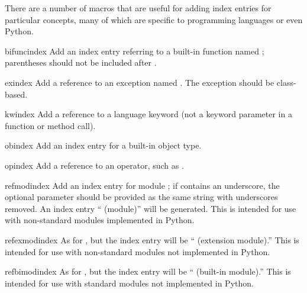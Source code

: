 \documentclass{howto}
\begin{document}
    There are a number of macros that are useful for adding index
    entries for particular concepts, many of which are specific to
    programming languages or even Python.

    \begin{macrodesc}{bifuncindex}{}
      Add an index entry referring to a built-in function named
      ; parentheses should not be included after
      .
    \end{macrodesc}

    \begin{macrodesc}{exindex}{}
      Add a reference to an exception named .  The
      exception should be class-based.
    \end{macrodesc}

    \begin{macrodesc}{kwindex}{}
      Add a reference to a language keyword (not a keyword parameter
      in a function or method call).
    \end{macrodesc}

    \begin{macrodesc}{obindex}{}
      Add an index entry for a built-in object type.
    \end{macrodesc}

    \begin{macrodesc}{opindex}{}
      Add a reference to an operator, such as \samp{+}.
    \end{macrodesc}

    \begin{macrodesc}{refmodindex}{}
      Add an index entry for module ; if 
      contains an underscore, the optional parameter  should
      be provided as the same string with underscores removed.  An
      index entry `` (module)'' will be generated.  This
      is intended for use with non-standard modules implemented in
      Python.
    \end{macrodesc}

    \begin{macrodesc}{refexmodindex}{}
      As for , but the index entry will be
      `` (extension module).''  This is intended for use
      with non-standard modules not implemented in Python.
    \end{macrodesc}

    \begin{macrodesc}{refbimodindex}{}
      As for , but the index entry will be
      `` (built-in module).''  This is intended for use
      with standard modules not implemented in Python.
    \end{macrodesc}
\end{document}
